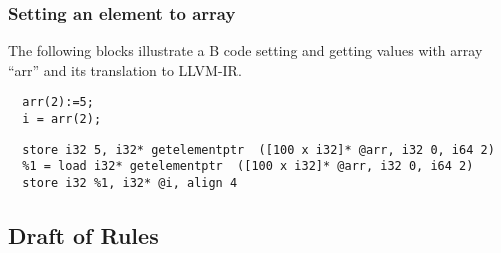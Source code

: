 \documentclass[10pt,a4paper]{article}
\newcommand{\trad}[2]{\ensuremath{\lVert \textsf{#1} \rVert^{\textit{#2}}}}
\newcommand{\nl}[0]{\ensuremath{\downarrow}}
\DeclareMathOperator{\isdef}{\equiv}
\DeclareMathOperator{\variable}{\mathcal{V}()}
\newcommand{\llvm}[1]{\texttt{#1}}
\newcommand{\B}[1]{\textsf{#1}}
\newcommand{\IF}[0]{\textbf{ if }}
\newcommand{\ELSIF}[0]{\textbf{ else if }}
\newcommand{\ELSE}[0]{\textbf{ else }}
\newcommand{\THEN}[0]{\textbf{ then }}
\newcommand{\LET}[0]{\textbf{ let }}
\newcommand{\IN}[0]{\textbf{ in }}
\newcommand{\AND}[0]{\textbf{ and }}
\newcommand{\PH}[1]{\framebox{$#1$}}
\newcommand{\sep}[0]{\otimes}
\newcommand{\local}[0]{\ensuremath{\sf\lambda}}
\newcommand{\idx}[0]{\ensuremath{\sf\Pi}}
\newcommand{\state}[0]{\ensuremath{\sf\Theta}}
\newcommand{\stateref}[0]{\ensuremath{\sf\Phi}}
\newcommand{\stateindex}[0]{\ensuremath{\sf\tau}}
\begin{document}
\iffalse
\begin{verbatim}
<temporary variable> = getelementptr  
  [<number of elements> x <element type>]   * @<variable_name>, 
  <type and index of pointer> <index_value>,
  <type and index. ex:i64>  <index_value>
\end{verbatim}
\fi

\subsubsection{Setting an element to array}

The following blocks illustrate a B code setting and getting values with array
``arr''  and its translation to LLVM-IR. 
\begin{footnotesize}

\begin{verbatim}
  arr(2):=5;
  i = arr(2);
\end{verbatim}
\end{footnotesize}

\begin{footnotesize}
\begin{verbatim}
  store i32 5, i32* getelementptr  ([100 x i32]* @arr, i32 0, i64 2)
  %1 = load i32* getelementptr  ([100 x i32]* @arr, i32 0, i64 2)
  store i32 %1, i32* @i, align 4
\end{verbatim}
\end{footnotesize}



\subsection{Draft of Rules}

\iffalse 
\paragraph{An atomic expression}

\begin{align*}
\lefteqn{\trad{n}{\B{Name}} \isdef \LET t = \trad{n.type}{\B{Type}} \IN} \\
& \IF \B{n} \mbox{ is a constant } \THEN \trad{n.value}{\B{Expr}} \\
& \ELSIF \B{n} \mbox{ is a local variable } \THEN
\llvm{""} \sep \local(\B{n}) \sep t \\
& \ELSE (\B{n} \mbox{ is a primitive state variable }) \LET p = \variable \AND v = \variable \IN \\
& \quad \llvm{"\PH{p} = getelementptr  \PH{\stateref(\B{n.root})} \%self\$, i32 0, i32 \PH{\idx(\B{n})} \nl} \\
& \quad \llvm{\PH{v} = load \PH{t}* \PH{p}\nl"} \sep v \sep t\\
& \ELSE (\B{n} \mbox{ is an array}) \LET p = \variable \AND v = \variable \IN \\
& \quad \llvm{"\PH{p} = getelementptr \PH{\state(\B{n.root})} \%self\$,
\PH{\stateindex(n)} \nl} \\
& \quad \llvm{\PH{v} = load \PH{t}* \PH{p}\nl"} \sep v \sep t
\\
\end{align*}
\fi
\end{document}
